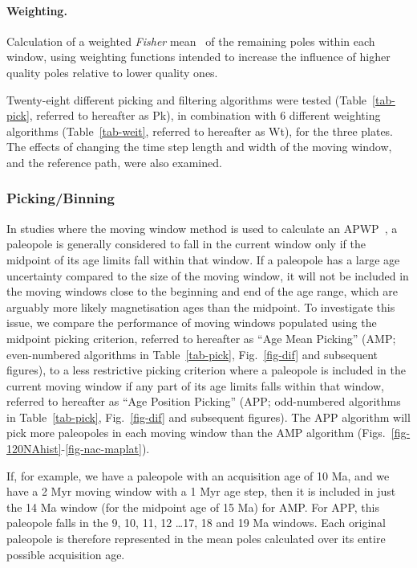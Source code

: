 \paragraph{Weighting.} Calculation of a weighted \emph{Fisher} mean~\citep{F53} of
the remaining poles within each window, using weighting functions intended to
increase the influence of higher quality poles relative to lower quality ones.

\bigskip
Twenty-eight different picking and filtering algorithms were tested
(Table~\ref{tab-pick}, referred to hereafter as Pk), in combination with 6
different weighting algorithms (Table~\ref{tab-weit}, referred to hereafter as
Wt), for the three plates. The effects of changing the time step length and
width of the moving window, and the reference path, were also examined.

\subsubsection{Picking/Binning}\label{sec:p}

In studies where the moving window method is used to calculate an
APWP~\citep{T99,T08}, a paleopole is generally considered to fall in the current
window only if the midpoint of its age limits fall within that window. If a
paleopole has a large age uncertainty compared to the size of the moving window,
it will not be included in the moving windows close to the beginning and end of
the age range, which are arguably more likely magnetisation ages than the
midpoint. To investigate this issue, we compare the performance of moving
windows populated using the midpoint picking criterion, referred to hereafter
as ``Age Mean Picking'' (AMP\@; even-numbered algorithms in
Table~\ref{tab-pick}, Fig.~\ref{fig-dif} and subsequent figures), to a less
restrictive picking criterion where a paleopole is included in the current
moving window if any part of its age limits falls within that window, referred
to hereafter as ``Age Position Picking'' (APP\@; odd-numbered algorithms in
Table~\ref{tab-pick}, Fig.~\ref{fig-dif} and subsequent figures). The APP
algorithm will pick more paleopoles in each moving window than the AMP algorithm
(Figs.~\ref{fig-120NAhist}-\ref{fig-nac-maplat}).

If, for example, we have a paleopole with an acquisition age of 10
Ma, and we have a 2 Myr moving window with a 1 Myr age step, then it is included
in just the 14 Ma window (for the midpoint age of 15 Ma) for
AMP\@. For APP, this paleopole falls in the 9, 10,
11, 12 \ldots 17, 18 and
19 Ma windows. Each original paleopole is therefore represented in
the mean poles calculated over its entire possible acquisition age.

